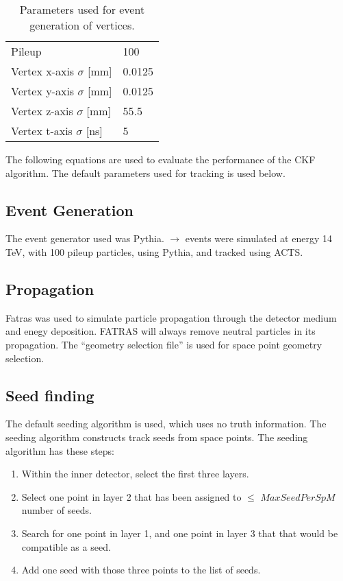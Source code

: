 \documentclass{article}
\newcommand{\pt}[0]{p_\textrm{T}}
\newcommand{\figtab}[3]{
\begin{table}[H]
\begin{tabular}{#1}
#2
\end{tabular}
\caption{#3}
\end{table}}
\begin{document}
\figtab{l l}{Pileup & 100\\
Vertex x-axis $\sigma$ [mm] & 0.0125\\
Vertex y-axis $\sigma$ [mm] & 0.0125\\
Vertex z-axis $\sigma$ [mm] & 55.5\\
Vertex t-axis $\sigma$ [ns] & 5}{Parameters used for event generation of vertices.}


The following equations are used to evaluate the performance of the CKF algorithm. The default parameters used for tracking is used below.

\subsection{Event Generation}

The event generator used was Pythia. \qqbar $\rightarrow$ \ttbar events were simulated at energy 14 TeV, with 100 pileup particles, using Pythia, and tracked using ACTS.

\subsection{Propagation}

Fatras was used to simulate particle propagation through the detector medium and enegy deposition. FATRAS will always remove neutral particles in its propagation. The ``geometry selection file'' is used for space point geometry selection.


\subsection{Seed finding}

The default seeding algorithm is used, which uses no truth information. The seeding algorithm constructs track seeds from space points. The seeding algorithm has these steps:

\begin{enumerate}
\item Within the inner detector, select the first three layers.
\item Select one point in layer 2 that has been assigned to $\leq$ $MaxSeedPerSpM$ number of seeds.
\item Search for one point in layer 1, and one point in layer 3 that that would be compatible as a seed.
\item Add one seed with those three points to the list of seeds.
\end{enumerate}
\end{document}

